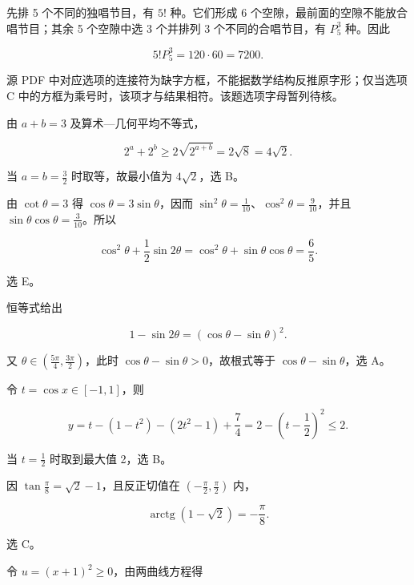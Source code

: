\begin{answer}

先排 5 个不同的独唱节目，有 $5!$ 种。它们形成 6 个空隙，最前面的空隙不能放合唱节目；其余 5 个空隙中选 3 个并排列 3 个不同的合唱节目，有 $P_5^3$ 种。因此

\nopagebreak[4]
\[
5!P_5^3=120\cdot60=7200.
\]

源 PDF 中对应选项的连接符为缺字方框，不能据数学结构反推原字形；仅当选项 C 中的方框为乘号时，该项才与结果相符。该题选项字母暂列待核。


由 $a+b=3$ 及算术—几何平均不等式，

\nopagebreak[4]
\[
2^a+2^b\ge 2\sqrt{2^{a+b}}=2\sqrt8=4\sqrt2.
\]

当 $a=b=\frac32$ 时取等，故最小值为 $4\sqrt2$，选 B。


由 $\cot\theta=3$ 得 $\cos\theta=3\sin\theta$，因而 $\sin^2\theta=\frac1{10}$、$\cos^2\theta=\frac9{10}$，并且 $\sin\theta\cos\theta=\frac3{10}$。所以

\nopagebreak[4]
\[
\cos^2\theta+\frac12\sin2\theta
=\cos^2\theta+\sin\theta\cos\theta
=\frac65.
\]

选 E。


恒等式给出

\nopagebreak[4]
\[
1-\sin2\theta=(\cos\theta-\sin\theta)^2.
\]

又 $\theta\in(\frac{5\pi}4,\frac{3\pi}2)$，此时 $\cos\theta-\sin\theta>0$，故根式等于 $\cos\theta-\sin\theta$，选 A。


令 $t=\cos x\in[-1,1]$，则

\nopagebreak[4]
\[
y=t-(1-t^2)-(2t^2-1)+\frac74
=2-\left(t-\frac12\right)^2\le2.
\]

当 $t=\frac12$ 时取到最大值 2，选 B。


因 $\tan\frac\pi8=\sqrt2-1$，且反正切值在 $(-\frac\pi2,\frac\pi2)$ 内，

\nopagebreak[4]
\[
\operatorname{arctg}(1-\sqrt2)=-\frac\pi8.
\]

选 C。


令 $u=(x+1)^2\ge0$，由两曲线方程得


\end{answer}
